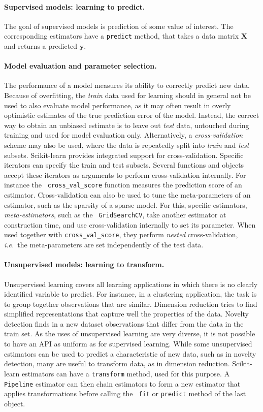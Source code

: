 \documentclass[a4paper]{article}
\begin{document}
\paragraph{Supervised models: learning to predict.}
%
The goal of supervised models is prediction of some value of interest.
The corresponding estimators
have a {\tt predict} method, that takes a data matrix $\mathbf{X}$ and
returns a predicted $\mathbf{y}$.

\paragraph{Model evaluation and parameter selection.}
%
The performance of a model measures its ability to correctly
predict new data. Because of overfitting, the \emph{train} data used for
learning
should in general not be used to also evaluate model performance, as it may often
result in overly optimistic estimates of the true prediction error of the model.
Instead, the correct way to obtain an unbiased estimate is to leave out \emph{test} data,
untouched during training and used for model evaluation only.
Alternatively, a \emph{cross-validation} scheme may also be
used, where the data is repeatedly split into \emph{train} and
\emph{test} subsets. Scikit-learn provides integrated support for
cross-validation. Specific iterators can specify the train and test
subsets. Several functions and objects accept these iterators as arguments to
perform cross-validation internally. For instance the {\tt
cross\_val\_score} function measures the prediction score of an
estimator. Cross-validation can also be used to tune the meta-parameters
of an estimator, such as the sparsity of a sparse model. For this,
specific estimators, \emph{meta-estimators}, such as the {\tt
GridSearchCV}, take another estimator at construction time, and use
cross-validation internally to set its parameter. When used together with
{\tt cross\_val\_score}, they perform \emph{nested} cross-validation,
\emph{i.e.}~the meta-parameters are set independently of the test data.

\paragraph{Unsupervised models: learning to transform.}
%
Unsupervised learning covers all learning applications in which there is
no clearly identified variable to predict. For instance, in a clustering
application, the task is to group together observations that are similar.
Dimension reduction tries to find simplified representations that capture
well the properties of the data. Novelty detection finds in a new dataset
observations that differ from the data in the train set. As the uses of
unsupervised learning are very diverse, it is not possible to have an API
as uniform as for supervised learning. While some unsupervised
estimators can be used to predict a characteristic of new data, such as
in novelty detection, many are useful to transform data, as in dimension
reduction. Scikit-learn estimators can have a {\tt transform} method, used
for this purpose. A {\tt Pipeline} estimator can then chain estimators to
form a new estimator that applies transformations before calling the {\tt
fit} or {\tt predict} method of the last object.
\end{document}
